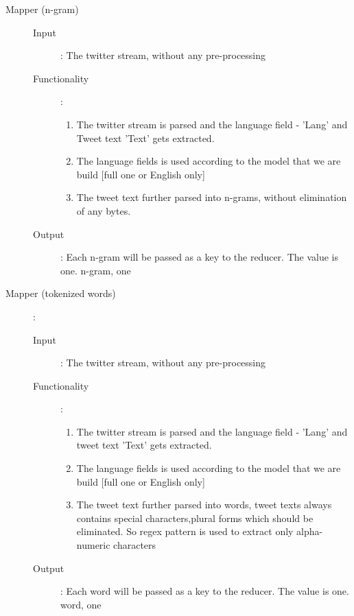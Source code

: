 \documentclass[a4paper,11pt]{article}
\begin{document}
\begin{flushleft}

\begin{description}

\item[Mapper (n-gram)]

\begin{description}
\item[Input]: The twitter stream, without any pre-processing

\item[Functionality]: \begin{enumerate} 
          \item The twitter stream is parsed and the language field - 'Lang'	and Tweet text 'Text' gets extracted.
	\item The language fields is used according to the model that we are build [full one or English only]
          \item The tweet text further parsed into n-grams, without elimination of any bytes.
\end{enumerate}

\item[Output]: Each n-gram will be passed as a key to the reducer. The value is one. {n-gram, one}
\end{description}

\item[Mapper (tokenized words)]:

\begin{description}
\item[Input]: The twitter stream, without any pre-processing

\item[Functionality]: \begin{enumerate}
	\item  The twitter stream is parsed and the language field - 'Lang' and tweet text 'Text' gets extracted.
	\item The language fields is used according to the model that we are build [full one or English only]
	\item The tweet text further parsed into words, tweet texts always contains special characters,plural forms which should be eliminated. So regex pattern is used to extract only alpha-numeric characters
\end{enumerate} 

\item[Output]: Each word will be passed as a key to the reducer. The value is one. 
		{word, one}
			

\end{description}
\end{description}
\end{flushleft}
\end{document}
